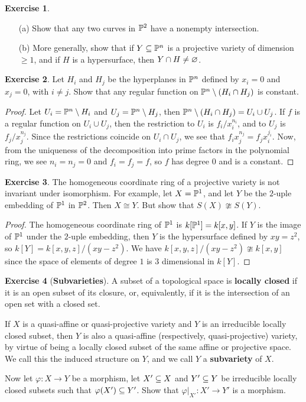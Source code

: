 \documentclass[11pt]{book}
\theoremstyle{definition}
\newtheorem{exercise}{Exercise}[section]
\begin{document}
\begin{exercise}
\mbox{}
\begin{itemize}
\item[(a)] Show that any two curves in $\P^2$ have a nonempty intersection.
\item[(b)] More generally, show that if $Y\sub\P^n$ is a projective variety of dimension $\geq 1$, and if $H$ is a hypersurface, then $Y\cap H\neq\emp$.
\end{itemize}
\end{exercise}
\begin{exercise}
Let $H_i$ and $H_j$ be the hyperplanes in $\P^n$ defined by $x_i=0$ and $x_j=0$, with $i\neq j$. Show that any regular function on $\P^n\setminus(H_i\cap H_j)$ is constant.
\end{exercise}
\begin{proof}
Let $U_i=\P^n\setminus H_i$ and $U_j=\P^n\setminus H_j$, then $\P^n\setminus(H_i\cap H_j)=U_i\cup U_j$. If $f$ is a regular function on $U_i\cup U_j$, then the restriction to $U_i$ is $f_i/x_i^{n_i}$, and to $U_j$ is $f_j/x_j^{n_j}$. Since the restrictions coincide on $U_i\cap U_j$, we see that $f_ix_j^{n_j}=f_jx_i^{j_i}$. Now, from the uniqueness of the decomposition into prime factors in the polynomial ring, we see $n_i=n_j=0$ and $f_i=f_j=f$, so $f$ has degree $0$ and is a constant. 
\end{proof}
\begin{exercise}
The homogeneous coordinate ring of a projective variety is not invariant under isomorphism. For example, let $X=\P^1$, and let $Y$ be the $2$-uple embedding of $\P^1$ in $\P^2$. Then $X\cong Y$. But show that $S(X)\ncong S(Y)$.
\end{exercise}
\begin{proof}
The homogeneous coordinate ring of $\P^1$ is $k[\P^1]=k[x,y]$. If $Y$ is the image of $\P^1$ under the $2$-uple embedding, then $Y$ is the hypersurface defined by $xy=z^2$, so $k[Y]=k[x,y,z]/(xy-z^2)$. We have $k[x,y,z]/(xy-z^2)\ncong k[x,y]$ since the space of elements of degree $1$ is $3$ dimensional in $k[Y]$.
\end{proof}
\begin{exercise}[\textbf{Subvarieties}]
A subset of a topological space is \textbf{locally closed} if it is an open subset of its closure, or, equivalently, if it is the intersection of an open set with a closed set.\par
If $X$ is a quasi-affine or quasi-projective variety and $Y$ is an irreducible locally closed subset, then $Y$ is also a quasi-affine (respectively, quasi-projective) variety, by virtue of being a locally closed subset of the same affine or projective space. We call this the induced structure on $Y$, and we call $Y$ a \textbf{subvariety} of $X$.\par
Now let $\varphi:X\to Y$ be a morphism, let $X'\sub X$ and $Y'\sub Y$ be irreducible locally closed subsets such that $\varphi(X')\sub Y'$. Show that $\varphi|_{X'}:X'\to Y'$ is a morphism.
\end{exercise}
\end{document}
